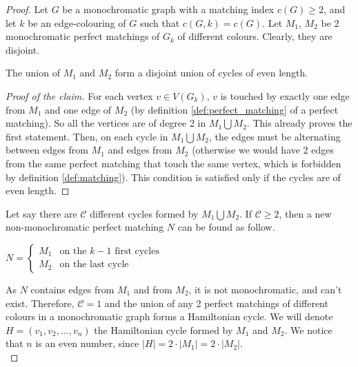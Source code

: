 \begin{proof}
    Let $G$ be a monochromatic graph with a matching index $c(G) \geq 2$, and let $k$ be an edge-colouring of $G$ such that $c(G, k) = c(G)$. Let $M_1$, $M_2$ be 2 monochromatic perfect matchings of $G_k$ of different colours. Clearly, they are disjoint. 
    
    \begin{claim}
        \label{clm:even_cycles}
        The union of $M_1$ and $M_2$ form a disjoint union of cycles of even length.
    \end{claim}
    
    \begin{proof}[Proof of the claim]
        For each vertex $v \in V(G_k)$, $v$ is touched by exactly one edge from $M_1$ and one edge of $M_2$ (by definition \ref{def:perfect_matching} of a perfect matching). So all the vertices are of degree 2 in $M_1 \bigcup M_2$. This already proves the first statement. Then, on each cycle in $M_1 \bigcup M_2$, the edges must be alternating between edges from $M_1$ and edges from $M_2$ (otherwise we would have 2 edges from the same perfect matching that touch the same vertex, which is forbidden by definition \ref{def:matching}). This condition is satisfied only if the cycles are of even length.
    \end{proof}
    
    Let say there are $\mathcal{C}$ different cycles formed by $M_1 \bigcup M_2$. If $\mathcal{C} \geq 2$, then a new non-monochromatic perfect matching $N$ can be found as follow.
    
    \begin{center}
        $N = \left\{
        \begin{array}{ll}
            M_1 & \mbox{on the } k - 1 \mbox{ first cycles} \\
            M_2 & \mbox{on the last cycle}
        \end{array}
        \right.$
    \end{center}

    As $N$ contains edges from $M_1$ and from $M_2$, it is not monochromatic, and can't exist. Therefore, $\mathcal{C} = 1$ and the union of any 2 perfect matchings of different colours in a monochromatic graph forms a Hamiltonian cycle. We will denote $H = (v_1, v_2, \dots, v_n)$ the Hamiltonian cycle formed by $M_1$ and $M_2$. We notice that $n$ is an even number, since $|H| = 2 \cdot |M_1| = 2 \cdot |M_2|$.\\


\end{proof}
